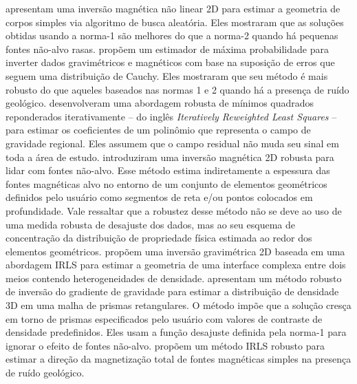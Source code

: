 \citet{silva_hohmann1983} apresentam uma inversão magnética não linear 2D para estimar a geometria de corpos simples via algoritmo de busca aleatória. Eles mostraram que as soluções obtidas usando a norma-1 são melhores do que a norma-2 quando há pequenas fontes não-alvo rasas. 
\citet{silva_cutrim1989} propõem um estimador de máxima probabilidade para inverter dados gravimétricos e magnéticos com base na suposição de erros que seguem uma distribuição de Cauchy.
Eles mostraram que seu método é mais robusto do que aqueles baseados nas normas 1 e 2 quando há a presença de ruído geológico.
\citet{beltrao_etal1991} desenvolveram uma abordagem robusta de mínimos quadrados reponderados iterativamente -- do inglês \textit{Iteratively Reweighted Least Squares} \citep{scales_gersztenkorn1988} -- para estimar os coeficientes de um polinômio que representa o campo de gravidade regional. 
Eles assumem que o campo residual não muda seu sinal em toda a área de estudo. 
\citet{barbosa_silva2006} introduziram uma inversão magnética 2D robusta para lidar com fontes não-alvo.
Esse método estima indiretamente a espessura das fontes magnéticas alvo no entorno de um conjunto de elementos geométricos definidos pelo usuário como segmentos de reta e/ou pontos colocados em profundidade. 
Vale ressaltar que a robustez desse método não se deve ao uso de uma medida robusta de desajuste dos dados, mas ao seu esquema de concentração da distribuição de propriedade física estimada ao redor dos elementos geométricos. 
\citet{silva_dias_etal2007} propõem uma inversão gravimétrica 2D baseada em uma abordagem IRLS para estimar a geometria de uma interface complexa entre dois meios contendo
heterogeneidades de densidade. 
\citet{uieda_barbosa2012} apresentam um método robusto de inversão do gradiente de gravidade para estimar a distribuição de densidade 3D em uma malha de prismas retangulares.
O método impõe que a solução cresça em torno de prismas especificados pelo usuário com valores de contraste de densidade predefinidos. Eles usam a função desajuste definida pela norma-1 para ignorar o efeito de fontes não-alvo.
\citet{oliveirajr_etal2015} propõem um método IRLS robusto para estimar a direção da magnetização total de fontes magnéticas simples na presença de ruído geológico.

